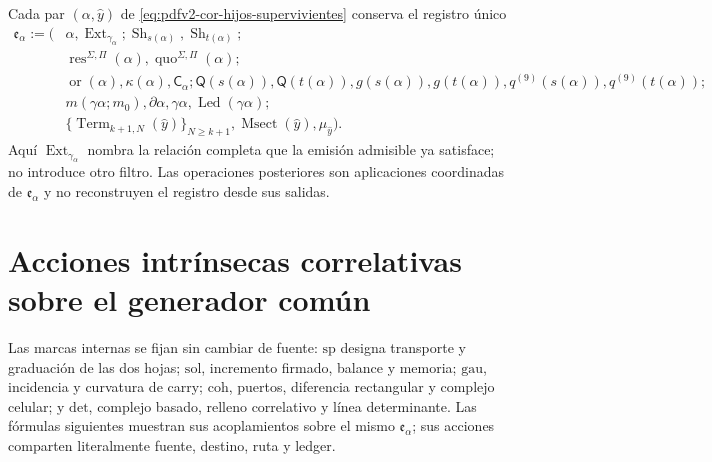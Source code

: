 Cada par \((\alpha,\widehat y)\) de
\eqref{eq:pdfv2-cor-hijos-supervivientes} conserva el registro único
\begin{equation}
\label{eq:pdfv2-cor-registro-extension}
 \begin{aligned}
 \mathfrak e_\alpha:=\bigl(&
 \alpha,\operatorname{Ext}_{\gamma_\alpha};
 \operatorname{Sh}_{s(\alpha)},\operatorname{Sh}_{t(\alpha)};\\
 &
 \operatorname{res}^{\Sigma,\Pi}(\alpha),
 \operatorname{quo}^{\Sigma,\Pi}(\alpha);\\
 &\operatorname{or}(\alpha),\kappa(\alpha),\mathsf C_\alpha;
 \mathsf Q(s(\alpha)),\mathsf Q(t(\alpha)),g(s(\alpha)),g(t(\alpha)),
 q^{(9)}(s(\alpha)),q^{(9)}(t(\alpha));\\
 &
 m(\gamma\alpha;m_0),\partial\alpha,\gamma\alpha,
 \operatorname{Led}(\gamma\alpha);\\
 &\{\operatorname{Term}_{k+1,N}(\widehat y)\}_{N\geq k+1},
 \operatorname{Msect}(\widehat y),\mu_{\widehat y}\bigr).
 \end{aligned}
\end{equation}
Aquí \(\operatorname{Ext}_{\gamma_\alpha}\) nombra la relación completa que
la emisión admisible ya satisface; no introduce otro filtro. Las operaciones
posteriores son aplicaciones coordinadas de \(\mathfrak e_\alpha\) y no
reconstruyen el registro desde sus salidas.

\section{Acciones intrínsecas correlativas sobre el generador común}

Las marcas internas se fijan sin cambiar de fuente:
\(\mathrm{sp}\) designa transporte y graduación de las dos hojas;
\(\mathrm{sol}\), incremento firmado, balance y memoria;
\(\mathrm{gau}\), incidencia y curvatura de carry;
\(\mathrm{coh}\), puertos, diferencia rectangular y complejo celular; y
\(\mathrm{det}\), complejo basado, relleno correlativo y línea determinante. Las fórmulas
siguientes muestran sus acoplamientos sobre el mismo
\(\mathfrak e_\alpha\); sus acciones comparten literalmente fuente, destino,
ruta y ledger.

